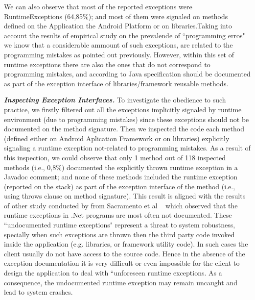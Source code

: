 \documentclass[conference]{IEEEtran}
\begin{document}
We can also observe that most of the reported exceptions were RuntimeExceptions
(64,85\%); and most of them were signaled on methods defined on the Application 
the Android Platform or on libraries.Taking into account the results of empirical study on 
the prevalende of ``programming erros" we know that a considerable ammount 
of such exceptions, are related to the programming mistakes
as pointed out previously. However, within this set of runtime exceptions there are also the ones that do not correspond to programming mistakes,
and according to Java specification should be documented as part of the exception interface of libraries/framework reusable
methods.

\emph{\textbf{Inspecting Exception Interfaces.}} To investigate the obedience to such practice, we firstly filtered out all the exceptions implicitly
 signaled by  runtime environment (due to programming mistakes) since these exceptions 
should not be documented on the method signature.  Then we inspected the code each method 
(defined either on Android  Aplication Framework or on libraries) 
explicitly signaling a runtime exception not-related to programming mistakes.
As a result of this inspection, we could observe that only 1 method out of 118 inspected methods
 (i.e., 0,8\%) documented the explicitly thrown runtime exception in a Javadoc comment; and none of these methods
included the runtime exception  (reported on the stack) as part of the exception interface of the method (i.e., using 
throws clause on method signature). This result is aligned with the results of other study conducted by from 
Sacramento et al ~\cite{sacramento2006unchecked} which observed that the
runtime exceptions in .Net programs are most often not documented.
These ``undocumented runtime exceptions" represent a threat to system robustness, specially
when such exceptions are thrown then the third party code invoked inside the application 
(e.g. libraries, or framework utility code). In such cases the client usually do not have access to 
the source code. Hence in the absence of the exception documentation it is very difficult or even impossible
 for the client to design the application to deal with ``unforeseen runtime exceptions. As a consequence, the
 undocumented runtime exception may remain uncaught and lead to system crashes.

\noindent {}
\end{document}
